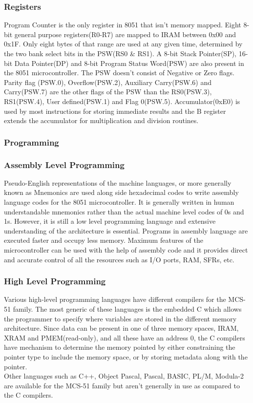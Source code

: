 \documentclass{lab_sheet}
\begin{document}
\subsubsection{Registers}
Program Counter is the only register in 8051 that isn't memory mapped.
 Eight 8-bit general purpose registers(R0-R7) are mapped to IRAM between 0x00 and 0x1F. 
 Only eight bytes of that range are used at any given time, determined by the two bank select bits in the PSW(RS0 \& RS1). A 8-bit Stack Pointer(SP), 16-bit Data Pointer(DP) and 8-bit Program Status Word(PSW) are also present in the 8051 microcontroller. The PSW doesn't consist of Negative or Zero flags. Parity flag (PSW.0), Overflow(PSW.2), Auxiliary Carry(PSW.6) and Carry(PSW.7) are the other flags of the PSW than the RS0(PSW.3), RS1(PSW.4), User defined(PSW.1) and Flag 0(PSW.5). Accumulator(0xE0) is used by most instructions for storing immediate results and the B register extends the accumulator for multiplication and division routines.
\subsubsection{Programming}
\subsubsection*{Assembly Level Programming}
Pseudo-English representations of the machine languages, or more generally known as Mnemonics are used along side hexadecimal codes to write assembly language codes for the 8051 microcontroller. It is generally written in human understandable mnemonics rather than the actual machine level codes of 0s and 1s. However, it is still a low level programming language and extensive understanding of the architecture is essential. Programs in assembly language are executed faster and occupy less memory. Maximum features of the microcontroller can be used with the help of assembly code and it provides direct and accurate control of all the resources such as I/O ports, RAM, SFRs, etc.
\subsubsection*{High Level Programming}
Various high-level programming languages have different compilers for the MCS-51 family. The most generic of these languages is the embedded C which allows the programmer to specify where variables are stored in the different memory architecture. Since data can be present in one of three memory spaces, IRAM, XRAM and PMEM(read-only), and all these have an address 0, the C compilers have mechanism to determine the memory pointed by either constraining the pointer type to include the memory space, or by storing metadata along with the pointer.\\
Other languages such as C++, Object Pascal, Pascal, BASIC, PL/M, Modula-2 are available for the MCS-51 family but aren't generally in use as compared to the C compilers.
\end{document}
